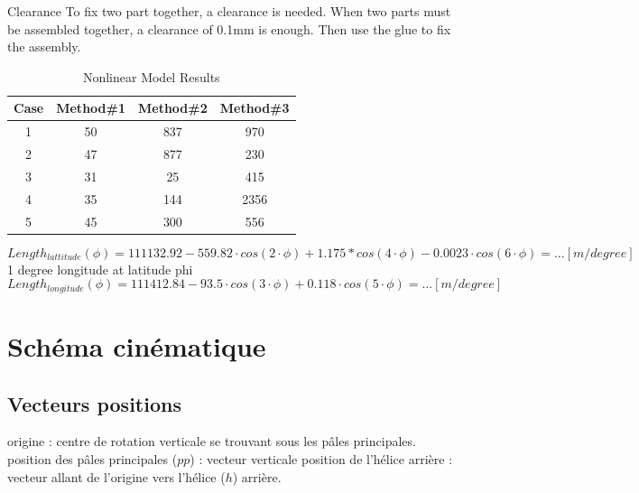 \documentclass[12pt,a4paper]{article}
\begin{document}
	Clearance
	To fix two part together, a clearance is needed.
	When two parts must be assembled together, a clearance of 0.1mm is enough. Then use the glue to fix the assembly. 
	
	
	
	\begin{table}[ht]
		\caption{Nonlinear Model Results} %
		\centering %
		\begin{tabular}{c c c c} %
			\hline\hline %
			Case & Method\#1 & Method\#2 & Method\#3 \\ [0.5ex] %
			\hline %
			1 & 50 & 837 & 970 \\ %
			2 & 47 & 877 & 230 \\
			3 & 31 & 25 & 415 \\
			4 & 35 & 144 & 2356 \\
			5 & 45 & 300 & 556 \\ [1ex] %
			\hline %
		\end{tabular}\label{table:nonlin} %
	\end{table}
	
	
	
	\begin{equation}
		Length_{lattitude}(\phi) = 111132.92-559.82 \cdot cos(2 \cdot \phi)+1.175*cos(4 \cdot \phi)-0.0023 \cdot cos(6 \cdot \phi)= ... [m/degree]
	\end{equation}
	1 degree longitude at latitude phi
	\begin{equation}
		Length_{longitude}(\phi) =
		111412.84-93.5 \cdot cos(3 \cdot \phi)+ 0.118 \cdot cos(5 \cdot \phi)= ... [m/degree]
	\end{equation}
	
	\newpage
	\section{Schéma cinématique}
	
	
	\subsection{Vecteurs positions}
	origine : centre de rotation verticale se trouvant sous les pâles principales.
	\medbreak
	position  des pâles principales ($pp$) : vecteur verticale
	\medbreak
	position de l'hélice arrière : 
	vecteur allant de l'origine vers l'hélice ($h$) arrière. 
	
\end{document}
